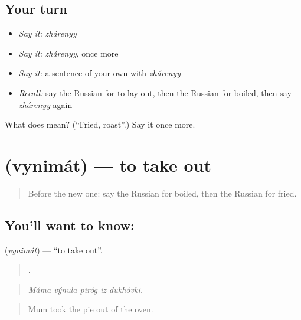 \subsection*{Your turn}
\begin{itemize}
\raggedright
  \item \emph{Say it:} \emph{zhárenyy}
  \item \emph{Say it:} \emph{zhárenyy}, once more
  \item \emph{Say it:} a sentence of your own with \emph{zhárenyy}
  \item \emph{Recall:} say the Russian for to lay out, then the Russian for boiled, then say \emph{zhárenyy} again
\end{itemize}

\begin{tcolorbox}[breakable,colback=teal!4,colframe=teal!35!black,title={Before you move on}]
What does  mean? (\textquotedblleft{}Fried, roast\textquotedblright{}.) Say it once more.
\end{tcolorbox}
\section[\texorpdfstring{\ru{вынимать} (vynimát)}{вынимать (vynimát)}]{ (vynimát) — to take out}

\label{lesson:RU-C336-vynimat}



\begin{quote}
Before the new one: say the Russian for boiled, then the Russian for fried.
\end{quote}

\subsection*{You'll want to know: }
\textbf{} (\emph{vynimát}) — \textquotedblleft{}to take out\textquotedblright{}.

\begin{quote}
    .
\end{quote}

\begin{quote}
\emph{Máma výnula piróg iz dukhóvki.}
\end{quote}

\begin{quote}
Mum took the pie out of the oven.
\end{quote}

